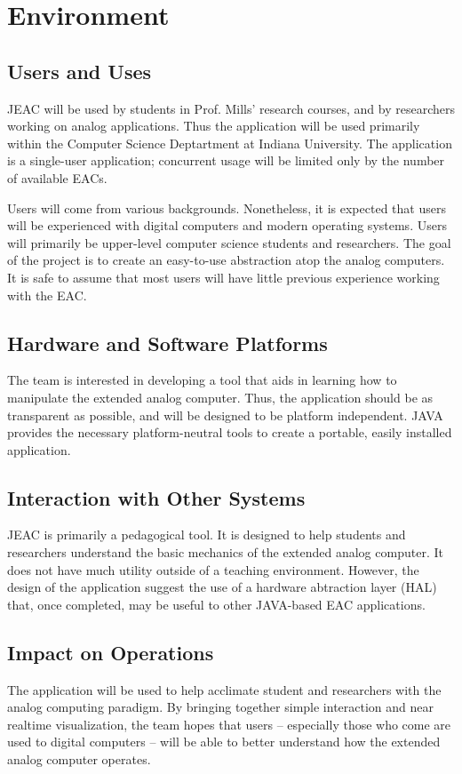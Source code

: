 \chapter{Environment}

\section{Users and Uses}

JEAC will be used by students in Prof. Mills' research courses, and by researchers working on analog applications.  Thus the application will be used primarily within the Computer Science Deptartment at Indiana University.  The application is a single-user application; concurrent usage will be limited only by the number of available EACs.

Users will come from various backgrounds.  Nonetheless, it is expected that users will be experienced with digital computers and modern operating systems.  Users will primarily be upper-level computer science students and researchers.  The goal of the project is to create an easy-to-use abstraction atop the analog computers.  It is safe to assume that most users will have little previous experience working with the EAC.

\section{Hardware and Software Platforms}


The team is interested in developing a tool that aids in learning how to manipulate the extended analog computer.  Thus, the application should be as transparent as possible, and will be designed to be platform independent.  JAVA provides the necessary platform-neutral tools to create a portable, easily installed application.

\section{Interaction with Other Systems}

JEAC is primarily a pedagogical tool.  It is designed to help students and researchers understand the basic mechanics of the extended analog computer.  It does not have much utility outside of a teaching environment.  However, the design of the application suggest the use of a hardware abtraction layer (HAL) that, once completed, may be useful to other JAVA-based EAC applications.

\section{Impact on Operations}

The application will be used to help acclimate student and researchers with the analog computing paradigm.  By bringing together simple interaction and near realtime visualization, the team hopes that users -- especially those who come are used to digital computers -- will be able to better understand how the extended analog computer operates.